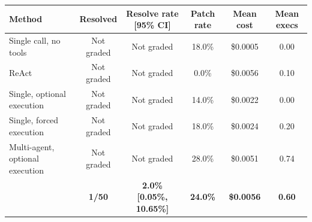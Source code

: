 \begin{tabular}{lccccc}
\toprule
Method & Resolved & Resolve rate [95\% CI] & Patch rate & Mean cost & Mean execs \\
\midrule
Single call, no tools & Not graded & Not graded & 18.0\% & \$0.0005 & 0.00 \\
ReAct & Not graded & Not graded & 0.0\% & \$0.0056 & 0.10 \\
\midrule
Single, optional execution & Not graded & Not graded & 14.0\% & \$0.0022 & 0.00 \\
Single, forced execution & Not graded & Not graded & 18.0\% & \$0.0024 & 0.20 \\
Multi-agent, optional execution & Not graded & Not graded & 28.0\% & \$0.0051 & 0.74 \\
\textbf{\agentforge{}} & \textbf{1/50} & \textbf{2.0\% [0.05\%, 10.65\%]} & \textbf{24.0\%} & \textbf{\$0.0056} & \textbf{0.60} \\
\bottomrule
\end{tabular}
